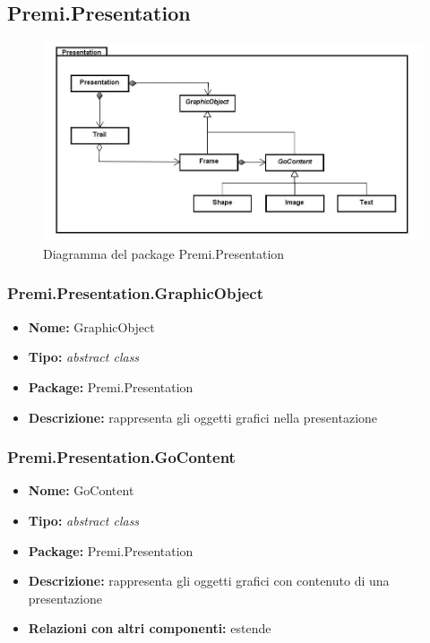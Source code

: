 \clearpage
\subsection{Premi.Presentation}
\begin{figure}[h]
\begin{center}
\includegraphics[scale=0.45]{img/diapkg/presentation-class.jpg}
\caption{Diagramma del package Premi.Presentation}
\end{center}
\end{figure}
\subsubsection{Premi.Presentation.GraphicObject}
\begin{itemize}
  \item \textbf{Nome:} GraphicObject
  \item \textbf{Tipo:} \textit{abstract class}
  \item \textbf{Package:} Premi.Presentation
  \item \textbf{Descrizione:} rappresenta gli oggetti grafici nella presentazione
\end{itemize}
\subsubsection{Premi.Presentation.GoContent}
\begin{itemize}
  \item \textbf{Nome:} GoContent
  \item \textbf{Tipo:} \textit{abstract class}
  \item \textbf{Package:} Premi.Presentation
  \item \textbf{Descrizione:} rappresenta gli oggetti grafici con contenuto di una presentazione
  \item \textbf{Relazioni con altri componenti:} estende 
\end{itemize}
